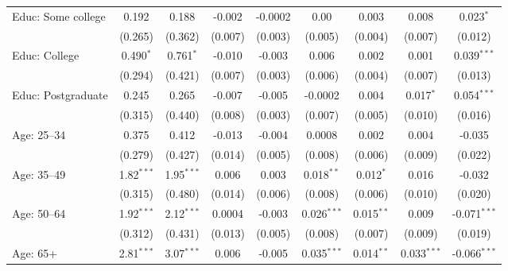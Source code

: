\begin{adjustbox}{width = \textwidth, center}
\begin{tabular}{lcccccccc}
      Educ: Some college      & 0.192         & 0.188         & -0.002        & -0.0002       & $0.00$   & 0.003                  & 0.008         & 0.023$^{*}$\\   
                              & (0.265)       & (0.362)       & (0.007)       & (0.003)       & (0.005)                & (0.004)                & (0.007)       & (0.012)\\   
      Educ: College           & 0.490$^{*}$   & 0.761$^{*}$   & -0.010        & -0.003        & 0.006                  & 0.002                  & 0.001         & 0.039$^{***}$\\   
                              & (0.294)       & (0.421)       & (0.007)       & (0.003)       & (0.006)                & (0.004)                & (0.007)       & (0.013)\\   
      Educ: Postgraduate      & 0.245         & 0.265         & -0.007        & -0.005        & -0.0002                & 0.004                  & 0.017$^{*}$   & 0.054$^{***}$\\   
                              & (0.315)       & (0.440)       & (0.008)       & (0.003)       & (0.007)                & (0.005)                & (0.010)       & (0.016)\\   
      Age: 25--34             & 0.375         & 0.412         & -0.013        & -0.004        & 0.0008                 & 0.002                  & 0.004         & -0.035\\   
                              & (0.279)       & (0.427)       & (0.014)       & (0.005)       & (0.008)                & (0.006)                & (0.009)       & (0.022)\\   
      Age: 35--49             & 1.82$^{***}$  & 1.95$^{***}$  & 0.006         & 0.003         & 0.018$^{**}$           & 0.012$^{*}$            & 0.016         & -0.032\\   
                              & (0.315)       & (0.480)       & (0.014)       & (0.006)       & (0.008)                & (0.006)                & (0.010)       & (0.020)\\   
      Age: 50--64             & 1.92$^{***}$  & 2.12$^{***}$  & 0.0004        & -0.003        & 0.026$^{***}$          & 0.015$^{**}$           & 0.009         & -0.071$^{***}$\\   
                              & (0.312)       & (0.431)       & (0.013)       & (0.005)       & (0.008)                & (0.007)                & (0.009)       & (0.019)\\   
      Age: 65+                & 2.81$^{***}$  & 3.07$^{***}$  & 0.006         & -0.005        & 0.035$^{***}$          & 0.014$^{**}$           & 0.033$^{***}$ & -0.066$^{***}$\\   

\end{tabular}
\end{adjustbox}

